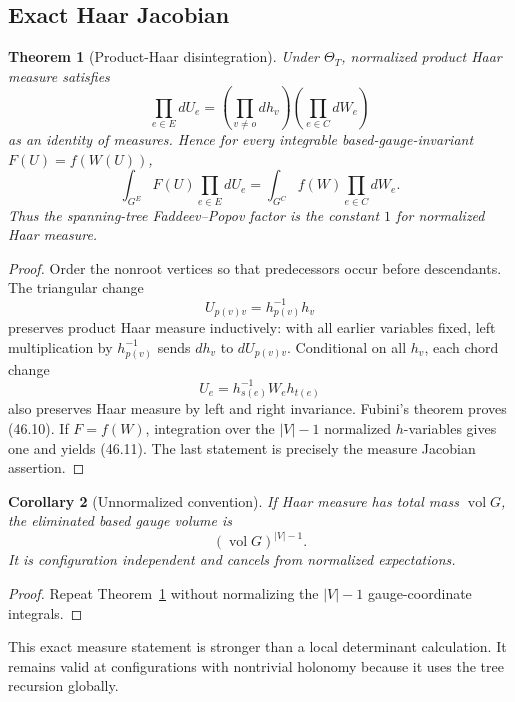 \documentclass[11pt]{article}
\newtheorem{theorem}{Theorem}[section]
\newtheorem{corollary}[theorem]{Corollary}
\begin{document}
\subsection{Exact Haar Jacobian}

\begin{theorem}[Product-Haar disintegration]
\label{thm:v11v46-haar}
Under \(\Theta_T\), normalized product Haar measure satisfies
\[
             \prod_{e\in E}dU_e
       =\left(\prod_{v\ne o}dh_v\right)
        \left(\prod_{e\in C}dW_e\right)                       \tag{46.10}
\]
as an identity of measures.  Hence for every integrable
based-gauge-invariant \(F(U)=f(W(U))\),
\[
                 \int_{G^E}F(U)\prod_{e\in E}dU_e
                  =\int_{G^C}f(W)\prod_{e\in C}dW_e.          \tag{46.11}
\]
Thus the spanning-tree Faddeev--Popov factor is the constant \(1\)
for normalized Haar measure.
\end{theorem}

\begin{proof}
Order the nonroot vertices so that predecessors occur before
descendants.  The triangular change
\[
                 U_{p(v)v}=h_{p(v)}^{-1}h_v
\]
preserves product Haar measure inductively: with all earlier variables
fixed, left multiplication by \(h_{p(v)}^{-1}\) sends \(dh_v\) to
\(dU_{p(v)v}\).  Conditional on all \(h_v\), each chord change
\[
                 U_e=h_{s(e)}^{-1}W_eh_{t(e)}
\]
also preserves Haar measure by left and right invariance.  Fubini's
theorem proves (46.10).  If \(F=f(W)\), integration over the
\(|V|-1\) normalized \(h\)-variables gives one and yields (46.11).
The last statement is precisely the measure Jacobian assertion.
\end{proof}

\begin{corollary}[Unnormalized convention]
\label{cor:v11v46-unnormalized}
If Haar measure has total mass \(\operatorname{vol}G\), the eliminated
based gauge volume is
\[
                         (\operatorname{vol}G)^{|V|-1}.        \tag{46.12}
\]
It is configuration independent and cancels from normalized
expectations.
\end{corollary}

\begin{proof}
Repeat Theorem~\ref{thm:v11v46-haar} without normalizing the
\(|V|-1\) gauge-coordinate integrals.
\end{proof}

This exact measure statement is stronger than a local determinant
calculation.  It remains valid at configurations with nontrivial
holonomy because it uses the tree recursion globally.
\end{document}
